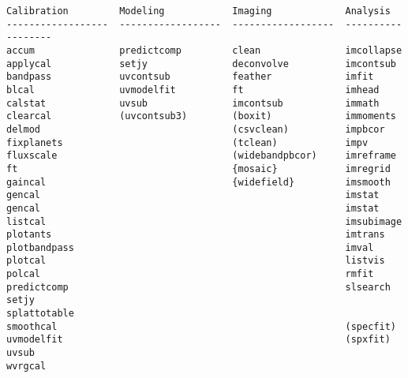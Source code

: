 \begin{verbatim}
Calibration         Modeling            Imaging             Analysis          
------------------  ------------------  ------------------  ------------------
accum               predictcomp         clean               imcollapse        
applycal            setjy               deconvolve          imcontsub         
bandpass            uvcontsub           feather             imfit             
blcal               uvmodelfit          ft                  imhead            
calstat             uvsub               imcontsub           immath            
clearcal            (uvcontsub3)        (boxit)             immoments         
delmod                                  (csvclean)          impbcor           
fixplanets                              (tclean)            impv              
fluxscale                               (widebandpbcor)     imreframe         
ft                                      {mosaic}            imregrid          
gaincal                                 {widefield}         imsmooth          
gencal                                                      imstat            
gencal                                                      imstat            
listcal                                                     imsubimage        
plotants                                                    imtrans           
plotbandpass                                                imval             
plotcal                                                     listvis           
polcal                                                      rmfit             
predictcomp                                                 slsearch          
setjy                                                       splattotable      
smoothcal                                                   (specfit)         
uvmodelfit                                                  (spxfit)          
uvsub                                                                         
wvrgcal                                                                       


\end{verbatim}

